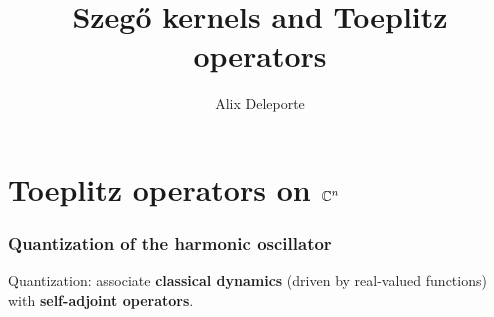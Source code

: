 \documentclass[mathserif]{beamer}
\title{Szeg\H{o} kernels and Toeplitz operators}
\author{Alix Deleporte}
\institute{MSRI}
\begin{document}
\begin{frame}
	\titlepage
\end{frame}

\section{Toeplitz operators on $\mathbb{C}^n$}
\begin{frame}
  \frametitle{Quantization of the harmonic oscillator}
  Quantization: associate {\bf classical dynamics} (driven by
  real-valued functions) with {\bf self-adjoint operators}.

\end{frame}
\end{document}
